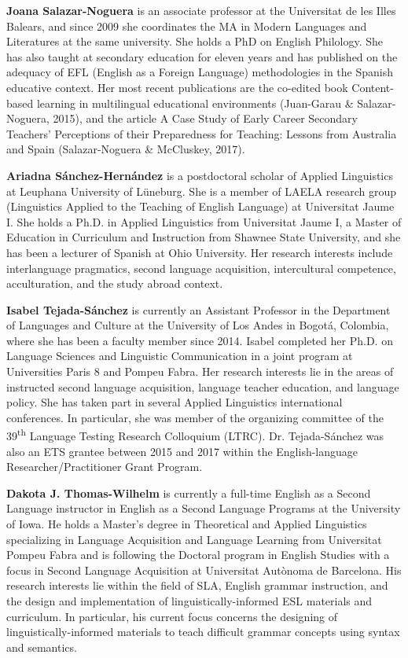 \textbf{Joana Salazar-Noguera} is an associate professor at the Universitat de les Illes Balears, and since 2009 she coordinates the MA in Modern Languages and Literatures at the same university. She holds a PhD on {English} Philology. She has also taught at secondary education for eleven years and has published on the adequacy of {EFL} ({English} as a Foreign Language) methodologies in the {Spanish} educative context. Her most recent publications are the co-edited book Content-based learning in {multilingual} educational environments (Juan-Garau \& Salazar-Noguera, 2015), and the article A Case Study of Early Career Secondary Teachers’ Perceptions of their Preparedness for Teaching: Lessons from Australia and Spain (Salazar-Noguera \& McCluskey, 2017).

\textbf{Ariadna Sánchez-Hernández} is a postdoctoral scholar of Applied {Linguistics} at Leuphana University of Lüneburg. She is a member of LAELA research group ({Linguistics} Applied to the Teaching of {English} Language) at Universitat Jaume I. She holds a Ph.D. in Applied {Linguistics} from Universitat Jaume I, a Master of Education in Curriculum and Instruction from Shawnee State University, and she has been a lecturer of {Spanish} at Ohio University. Her research interests include {interlanguage} {pragmatics}, second language {acquisition}, {intercultural} competence, {acculturation}, and the study abroad context.

\textbf{Isabel Tejada-Sánchez} is currently an Assistant Professor in the Department of Languages and Culture at the University of Los Andes in Bogotá, Colombia, where she has been a faculty member since 2014. Isabel completed her Ph.D. on Language Sciences and Linguistic Communication in a joint program at Universities Paris 8 and Pompeu Fabra. Her research interests lie in the areas of instructed second language {acquisition}, language teacher education, and {language policy}. She has taken part in several Applied {Linguistics} international conferences. In particular, she was member of the organizing committee of the 39\textsuperscript{th} Language Testing Research Colloquium (LTRC). Dr. Tejada-Sánchez was also an ETS grantee between 2015 and 2017 within the {English}-language Researcher/Practi\-tion\-er Grant Program.

\textbf{Dakota J. Thomas-Wilhelm} is currently a full-time {English} as a Second Language instructor in {English} as a Second Language Programs at the University of Iowa. He holds a Master’s degree in Theoretical and Applied Linguistics specializing in Language Acquisition and Language Learning from Universitat Pompeu Fabra and is following the Doctoral program in {English} Studies with a focus in Second Language Acquisition at Universitat Autònoma de Barcelona. His research interests lie within the field of {SLA}, {English} grammar instruction, and the design and implementation of linguistically-informed ESL materials and curriculum. In particular, his current focus concerns the designing of linguistically-informed materials to teach difficult grammar concepts using syntax and semantics. 

